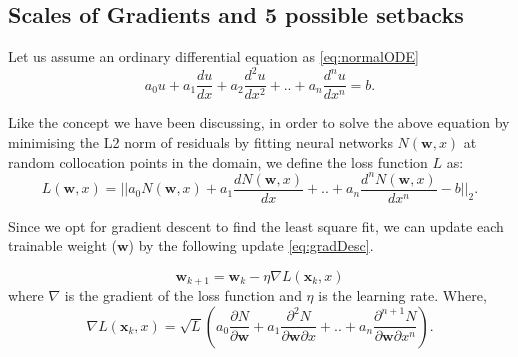 \documentclass{article}
\begin{document}
\subsection{Scales of Gradients and 5 possible setbacks}
\label{orderOfscales}
Let us assume an ordinary differential equation as \cref{eq:normalODE}
\begin{equation}
\label{eq:normalODE}
a_0 u + a_1 \frac{du}{dx} + a_2 \frac{d^2 u}{dx^2} + .. + a_n \frac{d^n u}{dx^n} = b.
\end{equation}

Like the concept we have been discussing, in order to solve the above equation by minimising the L2 norm of residuals by fitting neural networks $N(\mathbf{w},x)$ at random collocation points in the domain, we define the loss function $L$ as: 
\begin{equation}
\label{eq:normalLoss}
L(\mathbf{w},x) = || a_0 N(\mathbf{w},x) + a_1 \frac{dN(\mathbf{w},x)}{dx} + .. + a_n \frac{d^n N(\mathbf{w},x)}{dx^n} - b ||_2.
\end{equation}

Since we opt for gradient descent to find the least square fit, we can update each trainable weight ($\mathbf{w}$) by the following update \cref{eq:gradDesc}.

\begin{equation}
\label{eq:gradDesc}
\mathbf{w}_{k+1} = \mathbf{w}_k - \eta \nabla L(\mathbf{x}_k, x)
\end{equation}
where $\nabla$ is the gradient of the loss function and $\eta$ is the learning rate. Where, 
\begin{equation}
\label{eq:grad}
\nabla L(\mathbf{x}_k, x) = \sqrt{L}
(a_0 \frac{\partial N}{\partial \mathbf{w}} + a_1 \frac{\partial^2 N}{\partial \mathbf{w} \partial x} + .. + a_n \frac{\partial^{n+1} N} {\partial \mathbf{w} \partial x^n} ).
\end{equation}
\end{document}
